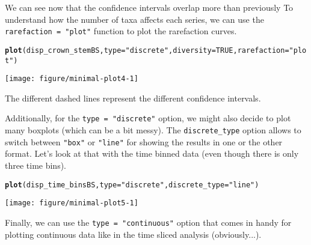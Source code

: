 \documentclass{article}\usepackage[]{graphicx}\usepackage[]{color}
\makeatletter
\newcommand{\hlnum}[1]{\textcolor[rgb]{0.686,0.059,0.569}{#1}}%
\newcommand{\hlstr}[1]{\textcolor[rgb]{0.192,0.494,0.8}{#1}}%
\newcommand{\hlstd}[1]{\textcolor[rgb]{0.345,0.345,0.345}{#1}}%
\newcommand{\hlkwc}[1]{\textcolor[rgb]{0.333,0.667,0.333}{#1}}%
\newcommand{\hlkwd}[1]{\textcolor[rgb]{0.737,0.353,0.396}{\textbf{#1}}}%
\newenvironment{kframe}{%
 \def\at@end@of@kframe{}%
 \ifinner\ifhmode%
  \def\at@end@of@kframe{\end{minipage}}%
  \begin{minipage}{\columnwidth}%
 \fi\fi%
 \def\FrameCommand##1{\hskip\@totalleftmargin \hskip-\fboxsep
 \colorbox{shadecolor}{##1}\hskip-\fboxsep
     \hskip-\linewidth \hskip-\@totalleftmargin \hskip\columnwidth}%
 \MakeFramed {\advance\hsize-\width
   \@totalleftmargin\z@ \linewidth\hsize
   \@setminipage}}%
 {\par\unskip\endMakeFramed%
 \at@end@of@kframe}
\newenvironment{knitrout}{}{} %
\makeatother
\begin{document}
We can see now that the confidence intervals overlap more than previously
To understand how the number of taxa affects each series, we can use the \texttt{rarefaction = "plot"} function to plot the rarefaction curves.

\begin{knitrout}
\color{fgcolor}\begin{kframe}
\begin{alltt}
\hlkwd{plot}\hlstd{(disp_crown_stemBS,} \hlkwc{type} \hlstd{=} \hlstr{"discrete"}\hlstd{,} \hlkwc{diversity} \hlstd{=} \hlnum{TRUE}\hlstd{,} \hlkwc{rarefaction} \hlstd{=} \hlstr{"plot"}\hlstd{)}
\end{alltt}
\end{kframe}

{\centering \texttt{[image: figure/minimal-plot4-1]} 

}



\end{knitrout}

The different dashed lines represent the different confidence intervals.

Additionally, for the \texttt{type = "discrete"} option, we might also decide to plot many boxplots (which can be a bit messy).
The \texttt{discrete\_type} option allows to switch between \texttt{"box"} or \texttt{"line"} for showing the results in one or the other format.
Let's look at that with the time binned data (even though there is only three time bins).

\begin{knitrout}
\color{fgcolor}\begin{kframe}
\begin{alltt}
\hlkwd{plot}\hlstd{(disp_time_binsBS,} \hlkwc{type} \hlstd{=} \hlstr{"discrete"}\hlstd{,} \hlkwc{discrete_type} \hlstd{=} \hlstr{"line"}\hlstd{)}
\end{alltt}
\end{kframe}

{\centering \texttt{[image: figure/minimal-plot5-1]} 

}



\end{knitrout}

Finally, we can use the \texttt{type = "continuous"} option that comes in handy for plotting continuous data like in the time sliced analysis (obviously...).
\end{document}
